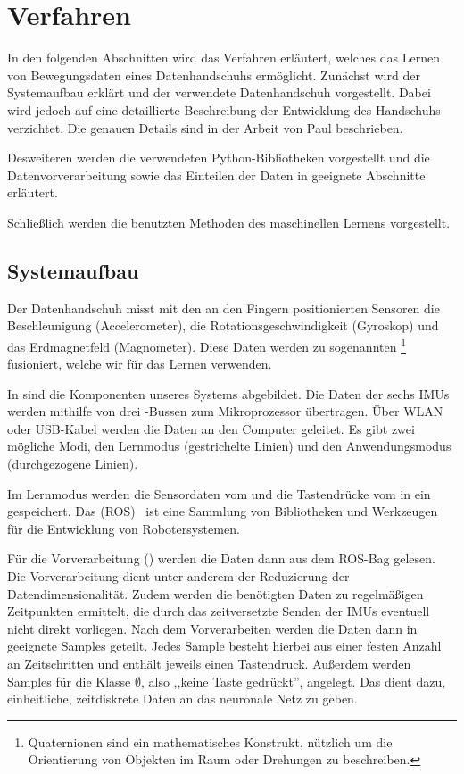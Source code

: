 \chapter{Verfahren} 

In den folgenden Abschnitten wird das Verfahren erläutert, welches das Lernen von Bewegungsdaten eines Datenhandschuhs ermöglicht. Zunächst wird der Systemaufbau erklärt und der verwendete Datenhandschuh vorgestellt. Dabei wird jedoch auf eine detaillierte Beschreibung der Entwicklung des Handschuhs verzichtet. Die genauen Details sind in der Arbeit von Paul \citet{paul} beschrieben.

Desweiteren werden die verwendeten Python-Bibliotheken vorgestellt und die Datenvorverarbeitung sowie das Einteilen der Daten in geeignete Abschnitte erläutert.

Schließlich werden die benutzten Methoden des maschinellen Lernens vorgestellt.

\section{Systemaufbau}

Der Datenhandschuh misst mit den an den Fingern positionierten Sensoren die Beschleunigung (Accelerometer), die Rotationsgeschwindigkeit (Gyroskop) und das Erdmagnetfeld (Magnometer). Diese Daten werden zu sogenannten \footnote{Quaternionen sind ein mathematisches Konstrukt, nützlich um die Orientierung von Objekten im Raum oder Drehungen zu beschreiben.} fusioniert, welche wir für das Lernen verwenden.

In  sind die Komponenten unseres Systems abgebildet.
Die Daten der sechs IMUs werden mithilfe von drei \iic-Bussen zum Mikroprozessor übertragen. Über WLAN oder USB-Kabel werden die Daten an den Computer geleitet. Es gibt zwei mögliche Modi, den Lernmodus (gestrichelte Linien) und den Anwendungsmodus (durchgezogene Linien).

Im Lernmodus werden die Sensordaten vom  und die Tastendrücke vom  in ein  gespeichert. Das  (ROS)~\cite{web:ros} ist eine Sammlung von Bibliotheken und Werkzeugen für die Entwicklung von Robotersystemen.

Für die Vorverarbeitung () werden die Daten dann aus dem ROS-Bag gelesen. Die Vorverarbeitung dient unter anderem der Reduzierung der Datendimensionalität. Zudem werden die benötigten Daten zu regelmäßigen Zeitpunkten ermittelt, die durch das zeitversetzte Senden der IMUs eventuell nicht direkt vorliegen. Nach dem Vorverarbeiten werden die Daten dann in geeignete Samples geteilt. Jedes Sample besteht hierbei aus einer festen Anzahl an Zeitschritten und enthält jeweils einen Tastendruck. Außerdem werden Samples für die Klasse $\emptyset$, also ,,keine Taste gedrückt'', angelegt. Das  dient dazu, einheitliche, zeitdiskrete Daten an das neuronale Netz zu geben.

